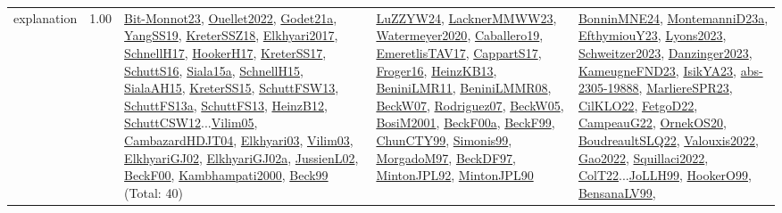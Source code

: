 {\begin{longtable}{p{3cm}r>{\raggedright\arraybackslash}p{6cm}>{\raggedright\arraybackslash}p{6cm}>{\raggedright\arraybackslash}p{8cm}}
\index{explanation}\index{Concepts!explanation}explanation &  1.00 & \hyperref[detail:Bit-Monnot23]{Bit-Monnot23}, \hyperref[detail:Ouellet2022]{Ouellet2022}, \hyperref[detail:Godet21a]{Godet21a}, \hyperref[detail:YangSS19]{YangSS19}, \hyperref[detail:KreterSSZ18]{KreterSSZ18}, \hyperref[detail:Elkhyari2017]{Elkhyari2017}, \hyperref[detail:SchnellH17]{SchnellH17}, \hyperref[detail:HookerH17]{HookerH17}, \hyperref[detail:KreterSS17]{KreterSS17}, \hyperref[detail:SchuttS16]{SchuttS16}, \hyperref[detail:Siala15a]{Siala15a}, \hyperref[detail:SchnellH15]{SchnellH15}, \hyperref[detail:SialaAH15]{SialaAH15}, \hyperref[detail:KreterSS15]{KreterSS15}, \hyperref[detail:SchuttFSW13]{SchuttFSW13}, \hyperref[detail:SchuttFS13a]{SchuttFS13a}, \hyperref[detail:SchuttFS13]{SchuttFS13}, \hyperref[detail:HeinzB12]{HeinzB12}, \hyperref[detail:SchuttCSW12]{SchuttCSW12}...\hyperref[detail:Vilim05]{Vilim05}, \hyperref[detail:CambazardHDJT04]{CambazardHDJT04}, \hyperref[detail:Elkhyari03]{Elkhyari03}, \hyperref[detail:Vilim03]{Vilim03}, \hyperref[detail:ElkhyariGJ02]{ElkhyariGJ02}, \hyperref[detail:ElkhyariGJ02a]{ElkhyariGJ02a}, \hyperref[detail:JussienL02]{JussienL02}, \hyperref[detail:BeckF00]{BeckF00}, \hyperref[detail:Kambhampati2000]{Kambhampati2000}, \hyperref[detail:Beck99]{Beck99} (Total: 40) & \hyperref[detail:LuZZYW24]{LuZZYW24}, \hyperref[detail:LacknerMMWW23]{LacknerMMWW23}, \hyperref[detail:Watermeyer2020]{Watermeyer2020}, \hyperref[detail:Caballero19]{Caballero19}, \hyperref[detail:EmeretlisTAV17]{EmeretlisTAV17}, \hyperref[detail:CappartS17]{CappartS17}, \hyperref[detail:Froger16]{Froger16}, \hyperref[detail:HeinzKB13]{HeinzKB13}, \hyperref[detail:BeniniLMR11]{BeniniLMR11}, \hyperref[detail:BeniniLMMR08]{BeniniLMMR08}, \hyperref[detail:BeckW07]{BeckW07}, \hyperref[detail:Rodriguez07]{Rodriguez07}, \hyperref[detail:BeckW05]{BeckW05}, \hyperref[detail:BosiM2001]{BosiM2001}, \hyperref[detail:BeckF00a]{BeckF00a}, \hyperref[detail:BeckF99]{BeckF99}, \hyperref[detail:ChunCTY99]{ChunCTY99}, \hyperref[detail:Simonis99]{Simonis99}, \hyperref[detail:MorgadoM97]{MorgadoM97}, \hyperref[detail:BeckDF97]{BeckDF97}, \hyperref[detail:MintonJPL92]{MintonJPL92}, \hyperref[detail:MintonJPL90]{MintonJPL90} & \hyperref[detail:BonninMNE24]{BonninMNE24}, \hyperref[detail:MontemanniD23a]{MontemanniD23a}, \hyperref[detail:EfthymiouY23]{EfthymiouY23}, \hyperref[detail:Lyons2023]{Lyons2023}, \hyperref[detail:Schweitzer2023]{Schweitzer2023}, \hyperref[detail:Danzinger2023]{Danzinger2023}, \hyperref[detail:KameugneFND23]{KameugneFND23}, \hyperref[detail:IsikYA23]{IsikYA23}, \hyperref[detail:abs-2305-19888]{abs-2305-19888}, \hyperref[detail:MarliereSPR23]{MarliereSPR23}, \hyperref[detail:CilKLO22]{CilKLO22}, \hyperref[detail:FetgoD22]{FetgoD22}, \hyperref[detail:CampeauG22]{CampeauG22}, \hyperref[detail:OrnekOS20]{OrnekOS20}, \hyperref[detail:BoudreaultSLQ22]{BoudreaultSLQ22}, \hyperref[detail:Valouxis2022]{Valouxis2022}, \hyperref[detail:Gao2022]{Gao2022}, \hyperref[detail:Squillaci2022]{Squillaci2022}, \hyperref[detail:ColT22]{ColT22}...\hyperref[detail:JoLLH99]{JoLLH99}, \hyperref[detail:HookerO99]{HookerO99}, \hyperref[detail:BensanaLV99]{BensanaLV99}, 
\end{longtable}}
